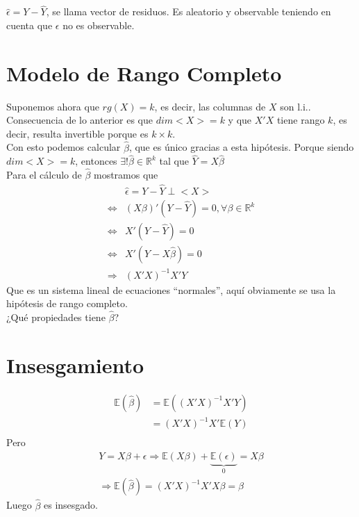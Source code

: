 \documentclass[10pt]{article}
\theoremstyle{plain}
\theoremstyle{definition}
\begin{document}
$\hat{\epsilon} = Y - \hat{Y}$, se llama vector de residuos. Es aleatorio y observable teniendo en cuenta que $\epsilon$ no es observable.


\section{Modelo de Rango Completo}
Suponemos ahora que $rg(X) = k$, es decir, las columnas de $X$ son l.i..\\

Consecuencia de lo anterior es que $dim <X> = k$ y que $X'X$ tiene rango $k$, es decir, resulta invertible porque es $k\times k$.\\
Con esto podemos calcular $\hat{\beta}$, que es único gracias a esta hipótesis. Porque siendo $dim <X> = k$, entonces $\exists ! \hat{\beta} \in \mathbb{R}^k$ tal que $\hat{Y} = X\hat{\beta}$\\

Para el cálculo de $\hat{\beta}$ mostramos que
\begin{align*}
& \hat{\epsilon} = Y - \hat{Y} \perp <X>\\
\Leftrightarrow & (X\beta)'(Y-\hat{Y}) = 0, \forall \beta \in \mathbb{R}^k\\
\Leftrightarrow & X'(Y-\hat{Y}) = 0\\
\Leftrightarrow & X'(Y-X\hat{\beta}) = 0\\
\Rightarrow & (X'X)^{-1}X'Y
\end{align*}
Que es un sistema lineal de ecuaciones ``normales'', aquí obviamente se usa la hipótesis de rango completo.\\

¿Qué propiedades tiene $\hat{\beta}$?
\section{Insesgamiento}
\begin{align*}
\mathbb{E}(\hat{\beta}) &= \mathbb{E}((X'X)^{-1}X'Y)\\
&= (X'X)^{-1}X'\mathbb{E}(Y)\\
\end{align*}
Pero 
\begin{align*}
Y = X\beta + \epsilon \Rightarrow \mathbb{E}(X\beta) + \underbrace{\mathbb{E}(\epsilon)}_{0} = X\beta\\
\Rightarrow \mathbb{E}(\hat{\beta}) = (X'X)^{-1}X'X\beta = \beta
\end{align*}
Luego $\hat{\beta}$ es insesgado.\\
\end{document}
